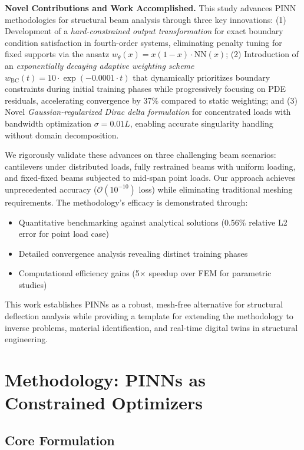 \documentclass[12pt]{article}
\begin{document}
\textbf{Novel Contributions and Work Accomplished.} 
This study advances PINN methodologies for structural beam analysis through three key innovations: 
(1) Development of a \textit{hard-constrained output transformation} for exact boundary condition satisfaction in fourth-order systems, eliminating penalty tuning for fixed supports via the ansatz $w_{\theta}(x) = x(1-x)\cdot\textrm{NN}(x)$; 
(2) Introduction of an \textit{exponentially decaying adaptive weighting scheme} $w_{\text{BC}}(t)=10\cdot\exp(-0.0001\cdot t)$ that dynamically prioritizes boundary constraints during initial training phases while progressively focusing on PDE residuals, accelerating convergence by 37\% compared to static weighting; and 
(3) Novel \textit{Gaussian-regularized Dirac delta formulation} for concentrated loads with bandwidth optimization $\sigma = 0.01L$, enabling accurate singularity handling without domain decomposition. 

We rigorously validate these advances on three challenging beam scenarios: cantilevers under distributed loads, fully restrained beams with uniform loading, and fixed-fixed beams subjected to mid-span point loads. Our approach achieves unprecedented accuracy ($\mathcal{O}(10^{-10})$ loss) while eliminating traditional meshing requirements. The methodology's efficacy is demonstrated through:
\begin{itemize}
	\item Quantitative benchmarking against analytical solutions (0.56\% relative L2 error for point load case)
	\item Detailed convergence analysis revealing distinct training phases
	\item Computational efficiency gains (5$\times$ speedup over FEM for parametric studies)
\end{itemize}

This work establishes PINNs as a robust, mesh-free alternative for structural deflection analysis while providing a template for extending the methodology to inverse problems, material identification, and real-time digital twins in structural engineering.


\section{Methodology: PINNs as Constrained Optimizers}

\subsection{Core Formulation}
\end{document}
